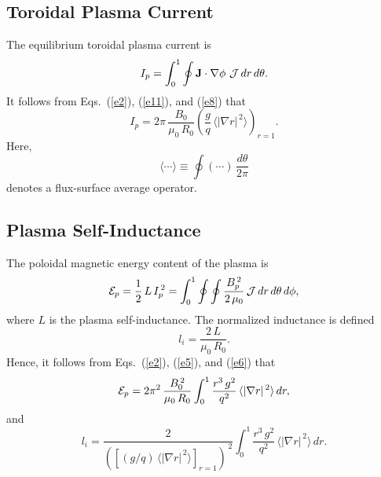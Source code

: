 \documentclass[12pt,prb,aps,notitlepage]{revtex4-1}
\begin{document}
\subsection{Toroidal Plasma Current}
The equilibrium toroidal plasma current is
\begin{equation}
I_p = \int_0^1\oint {\bf J}\cdot\nabla \phi\,\,{\cal J}\,dr\,d\theta.
\end{equation}
It follows from Eqs.~(\ref{e2}), (\ref{e11}), and (\ref{e8}) that
\begin{equation}
I_p = 2\pi\,\frac{B_0}{\mu_0\,R_0}\left(\frac{g}{q}\,\langle |\nabla r|^{\,2}\rangle\right)_{r=1}.
\end{equation}
Here,
\begin{equation}
\langle\cdots\rangle \equiv \oint (\cdots)\,\frac{d\theta}{2\pi}
\end{equation}
denotes a flux-surface average operator.

\subsection{Plasma Self-Inductance}
The poloidal magnetic energy content of the plasma is 
\begin{equation}
{\cal E}_p = \frac{1}{2}\,L\,I_p^{\,2} = \int_0^1\oint\oint \frac{B_p^{\,2}}{2\,\mu_0}\,{\cal J}\,dr\,d\theta\,d\phi,
\end{equation}
where $L$ is the plasma self-inductance. 
The normalized  inductance is defined
\begin{equation}
l_i = \frac{2\,L}{\mu_0\,R_0}.
\end{equation}
Hence, it follows from Eqs.~(\ref{e2}), (\ref{e5}), and (\ref{e6}) that 
\begin{equation}
{\cal E}_p = 2\pi^2\,\frac{B_0^{\,2}}{\mu_0\,R_0}\int_0^1 \frac{r^3\,g^2}{q^2}\,\langle |\nabla r|^{\,2}\rangle\,dr,
\end{equation}
and
\begin{equation}
l_i = \frac{2}{\left([(g/q)\,\langle |\nabla r|^{\,2}\rangle]_{r=1}\right)^{\,2}}\int_0^1 \frac{r^3\,g^2}{q^2}\,\langle |\nabla r|^{\,2}\rangle\,dr.
\end{equation}
\end{document}
